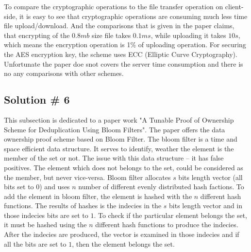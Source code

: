 \documentclass[12pt]{article}
\begin{document}
To compare the cryptographic operations to the file transfer operation on client-side, it is easy to see that cryptographic operations are consuming much less time file upload/download. And the comparisons that is given in the paper \cite{CovergentEnc} claims, that encrypting of the  $0.8 mb$  size file takes $0.1ms$, while uploading it takes $10s$, which means the encryption operation is 1\% of uploading operation. For securing the AES encryption key, the scheme uses ECC (Elliptic Curve Cryptography).\cite{ECC}  Unfortunate the paper\cite{CovergentEnc} doe snot covers the server time consumption and there is no any comparisons with other schemes. 


\subsection{Solution \# 6}
\label{sub:Soltuion6}
This subsection is dedicated to a paper work "A Tunable Proof of Ownership Scheme for Deduplication Using Bloom Filters".\cite{BF} The paper offers  the data ownership proof scheme based on Bloom Filter.\cite{BF-Original} The bloom filter is a time and space efficient data structure. It serves to identify, weather the element is  the member of the set or not. The issue with this data structure -- it has false positives. The element which does not belongs to the set, could be considered as the member, but never vice-versa. Bloom filter allocates $s$ bits length vector (all bits set to $0$) and uses $n$ number of different evenly distributed hash factions. To add the element in bloom filter, the element is hashed with the $n$ different hash functions. The results of hashes is the indecies in the $s$ bits length vector and in those indecies bits are set to $1$. To check if the particular element belongs the set, it must be hashed using the $n$ different hash functions to produce the indecies. After the indecies are produced, the vector is examined in those indecies and if all the bits are set to $1$, then the  element belongs the set.
\end{document}
